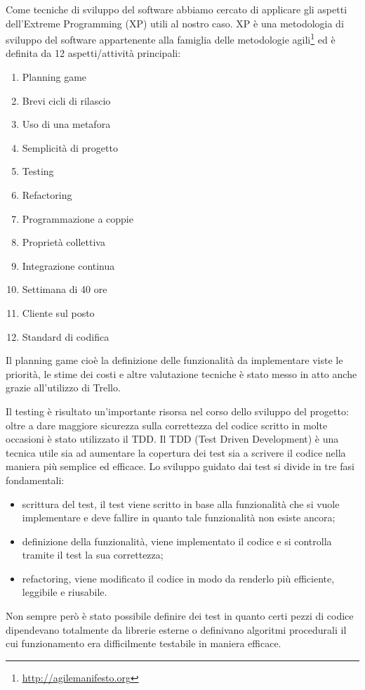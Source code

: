 \documentclass[12pt]{report}
\begin{document}
Come tecniche di sviluppo del software abbiamo cercato di applicare gli aspetti dell'Extreme Programming (XP)\cite{XP} utili al nostro caso. XP è una metodologia di sviluppo del software appartenente alla famiglia delle metodologie agili\footnote{\url{http://agilemanifesto.org}} ed è definita da 12 aspetti/attività principali:
\begin{enumerate}
\item Planning game
\item Brevi cicli di rilascio
\item Uso di una metafora
\item Semplicità di progetto
\item Testing
\item Refactoring
\item Programmazione a coppie 
\item Proprietà collettiva 
\item Integrazione continua
\item Settimana di 40 ore
\item Cliente sul posto
\item Standard di codifica
\end{enumerate}

Il planning game cioè la definizione delle funzionalità da implementare viste le priorità, le stime dei costi e altre valutazione tecniche è stato messo in atto anche grazie all'utilizzo di Trello. 

Il testing è risultato un'importante risorsa nel corso dello sviluppo del progetto: oltre a dare maggiore sicurezza sulla correttezza del codice scritto in molte occasioni è stato utilizzato il TDD. Il TDD (Test Driven Development) è una tecnica utile sia ad aumentare la copertura dei test sia a scrivere il codice nella maniera più semplice ed efficace. Lo sviluppo guidato dai test si divide in tre fasi fondamentali:
\begin{itemize}
\item scrittura del test, il test viene scritto in base alla funzionalità che si vuole implementare e deve fallire in quanto tale funzionalità non esiste ancora;
\item definizione della funzionalità, viene implementato il codice e si controlla tramite il test la sua correttezza;
\item refactoring, viene modificato il codice in modo da renderlo più efficiente, leggibile e riusabile.
\end{itemize}

Non sempre però è stato possibile definire dei test in quanto certi pezzi di codice dipendevano totalmente da librerie esterne o definivano algoritmi procedurali il cui funzionamento era difficilmente testabile in maniera efficace. 
\end{document}
